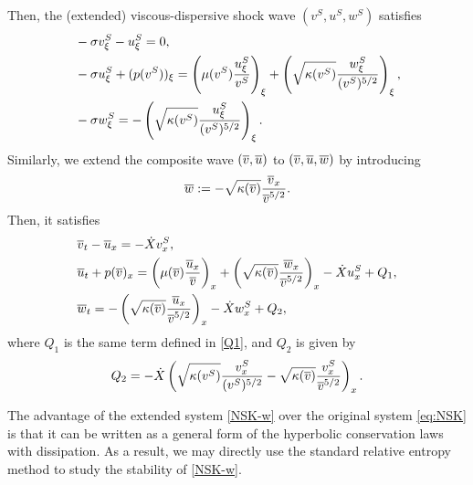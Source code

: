 \documentclass[11pt,reqno]{amsart}
\begin{document}
   	Then, the (extended) viscous-dispersive shock wave $(v^S,u^S,w^S)$ satisfies
    \begin{align}
    \begin{aligned}\label{viscous-dispersive-shock-ext}
    &-\sigma v^S_\xi-u^S_\xi=0,\\
    &-\sigma u^S_\xi+(p(v^S))_\xi=\left(\mu(v^S) \frac{u^S_\xi}{v^S} \right)_\xi+\left( \sqrt{\kappa(v^S)} \frac{w^S_\xi}{(v^S)^{5/2}} \right)_\xi,\\
    &-\sigma w^S_\xi=-\left(\sqrt{\kappa(v^S)}\frac{u^S_\xi}{(v^S)^{5/2}} \right)_\xi.
    \end{aligned}
    \end{align}
Similarly, we extend the composite wave $(\overline{v},\overline{u})$ to $(\overline{v},\overline{u},\overline{w})$ by introducing
\[\overline{w}:=-\sqrt{\kappa(\overline{v})}\dfrac{\overline{v}_x}{\overline{v}^{5/2}}.
\]
Then, it satisfies
\begin{equation}
\begin{aligned}\label{superposition wave-ext}
    &\overline{v}_t-\overline{u}_x=-\dot{X} v^S_x, \\
    &\overline{u}_t+p(\overline{v})_x= \left(\mu(\overline{v}) \dfrac{\overline{u}_x}{\overline{v}}\right)_x +  \left(\sqrt{\kappa(\overline{v})} \dfrac{\overline{w}_x}{\overline{v}^{5/2}}\right)_x-\dot{X} u^S_x+Q_1,\\ 
    &\overline{w}_t= -\left( \sqrt{\kappa(\overline{v})} \dfrac{\overline{u}_x}{\overline{v}^{5/2}}\right)_x-\dot{X} w^S_x +Q_2, 
\end{aligned}
\end{equation}
where $Q_1$ is the same term defined in \eqref{Q1}, and $Q_2$ is given by
\begin{equation} \label{Q2}
    \begin{aligned}
    Q_2=- \dot{X} \left(   \sqrt{\kappa(v^S)} \dfrac{ v^S_x}{(v^S)^{5/2}} -  \sqrt{\kappa(\overline{v})}\dfrac{ v^S_x}{\overline{v}^{5/2}}  \right)_x.
    \end{aligned}
\end{equation}

The advantage of the extended system \eqref{NSK-w} over the original system \eqref{eq:NSK} is that it can be written as a general form of the hyperbolic conservation laws with dissipation. As a result, we may directly use the standard relative entropy method \cite{D96,D79} to study the stability of \eqref{NSK-w}.\\
\end{document}
